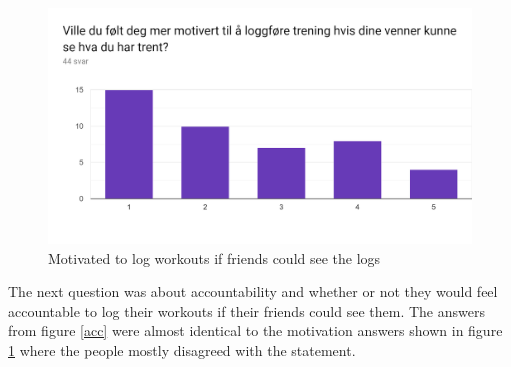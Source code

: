 \begin{figure}[H]
    \centering
    \includegraphics[width=120mm]{figures/MotivertTilLogging.png}
    \caption{Motivated to log workouts if friends could see the logs}
    \label{moti}
\end{figure}

The next question was about accountability and whether or not they would feel accountable to log their workouts if their friends could see them. The answers from figure \ref{acc} were almost identical to the motivation answers shown in figure \ref{moti} where the people mostly disagreed with the statement.

